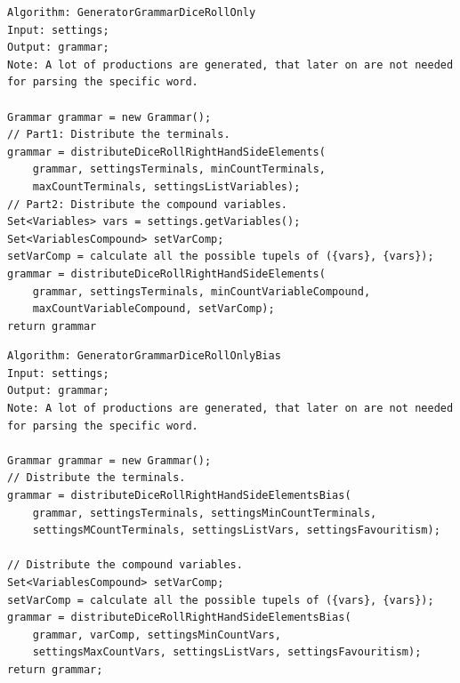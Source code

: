 \pagebreak

\lstset{language=java}
\begin{lstlisting}[frame=htrbl,caption={GeneratorGrammarDiceRollOnly}, 
label={lst:GeneratorGrammarDiceRollOnly}]
Algorithm: GeneratorGrammarDiceRollOnly
Input: settings;
Output: grammar;
Note: A lot of productions are generated, that later on are not needed
for parsing the specific word.

Grammar grammar = new Grammar();
// Part1: Distribute the terminals.
grammar = distributeDiceRollRightHandSideElements(
	grammar, settingsTerminals, minCountTerminals, 
	maxCountTerminals, settingsListVariables);
// Part2: Distribute the compound variables.
Set<Variables> vars = settings.getVariables();
Set<VariablesCompound> setVarComp;
setVarComp = calculate all the possible tupels of ({vars}, {vars});
grammar = distributeDiceRollRightHandSideElements(
	grammar, settingsTerminals, minCountVariableCompound, 
	maxCountVariableCompound, setVarComp);
return grammar
\end{lstlisting}

\pagebreak

\lstset{language=java}
\begin{lstlisting}[frame=htrbl,caption={GeneratorGrammarDiceRollOnlyBias}, 
label={lst:GeneratorGrammarDiceRollOnlyBias}]
Algorithm: GeneratorGrammarDiceRollOnlyBias
Input: settings;
Output: grammar;
Note: A lot of productions are generated, that later on are not needed
for parsing the specific word.

Grammar grammar = new Grammar();
// Distribute the terminals.
grammar = distributeDiceRollRightHandSideElementsBias(
	grammar, settingsTerminals, settingsMinCountTerminals, 
	settingsMCountTerminals, settingsListVars, settingsFavouritism);

// Distribute the compound variables.
Set<VariablesCompound> setVarComp;
setVarComp = calculate all the possible tupels of ({vars}, {vars});
grammar = distributeDiceRollRightHandSideElementsBias(
	grammar, varComp, settingsMinCountVars,
	settingsMaxCountVars, settingsListVars, settingsFavouritism);
return grammar;
\end{lstlisting}

\pagebreak

